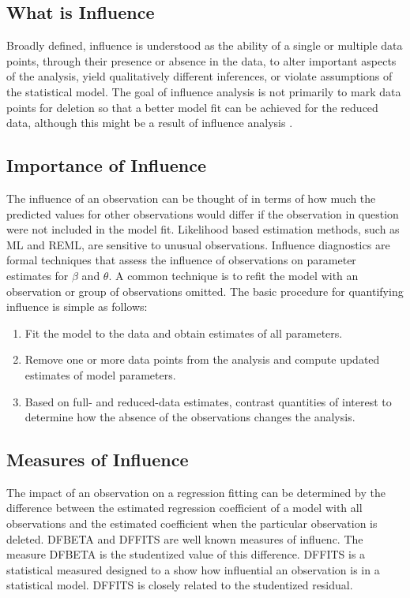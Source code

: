 \documentclass[Main.tex]{subfiles}
\begin{document}
\subsection{What is Influence} %


Broadly defined, influence is understood as the ability of a single or multiple data points, through their presence or absence in the data, to alter important aspects of the analysis, yield qualitatively different inferences, or violate assumptions of the statistical model. The goal of influence analysis is not primarily to mark data points for deletion so that a better model fit can be achieved for the reduced data, although this might be a result of influence analysis \citep{schabenberger}.


\subsection{Importance of Influence}
The influence of an observation can be thought of in terms of how much the predicted values for other observations would differ if the observation in question were not included in the model fit.
Likelihood based estimation methods, such as ML and REML, are sensitive to unusual observations. Influence diagnostics are formal techniques that assess the influence of observations on parameter estimates for $\beta$ and $\theta$. A common technique is to refit the model with an observation or group of observations omitted. The basic procedure for quantifying influence is simple as follows:


\begin{enumerate}
	\item Fit the model to the data and obtain estimates of all parameters.
	\item Remove one or more data points from the analysis and compute updated estimates of model parameters.
	\item Based on full- and reduced-data estimates, contrast quantities of interest to determine how the absence of the observations changes the analysis.
\end{enumerate}
\subsection{Measures of Influence} 
The impact of an observation on a regression fitting can be determined by the difference between the estimated regression coefficient of a model with all observations and the estimated coefficient when the particular observation is deleted. DFBETA and DFFITS are well known measures of influenc. The measure DFBETA is the studentized value of this difference.	DFFITS is a statistical measured designed to a show how influential an observation is in a statistical model. DFFITS is closely related to the studentized residual.
\end{document}
